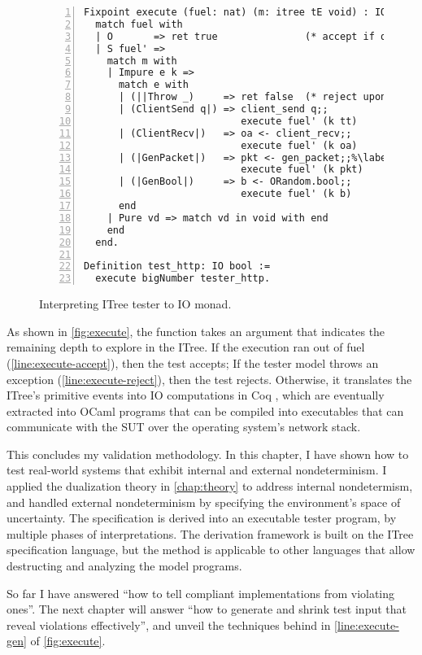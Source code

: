 \begin{figure}
\begin{lstlisting}[style=customcoq,numbers=left,escapechar=\%]
Fixpoint execute (fuel: nat) (m: itree tE void) : IO bool :=
  match fuel with
  | O       => ret true               (* accept if out of fuel *)%\label{line:execute-accept}%
  | S fuel' =>
    match m with
    | Impure e k =>
      match e with
      | (||Throw _)     => ret false  (* reject upon exception *)%\label{line:execute-reject}%
      | (ClientSend q|) => client_send q;;
                           execute fuel' (k tt)
      | (ClientRecv|)   => oa <- client_recv;;
                           execute fuel' (k oa)
      | (|GenPacket|)   => pkt <- gen_packet;;%\label{line:execute-gen}%
                           execute fuel' (k pkt)
      | (|GenBool|)     => b <- ORandom.bool;;
                           execute fuel' (k b)
      end
    | Pure vd => match vd in void with end
    end
  end.

Definition test_http: IO bool :=
  execute bigNumber tester_http.
\end{lstlisting}
\caption{Interpreting ITree tester to IO monad.}
\label{fig:execute}
\end{figure}

As shown in \autoref{fig:execute}, the  function takes an
argument  that indicates the remaining depth to explore in the ITree.
If the execution ran out of fuel (\autoref{line:execute-accept}), then the test
accepts; If the tester model throws an exception
(\autoref{line:execute-reject}), then the test rejects.  Otherwise, it
translates the ITree's primitive events into IO computations in Coq , which are eventually extracted into OCaml programs
that can be compiled into executables that can communicate with the SUT over the
operating system's network stack.

This concludes my validation methodology.  In this chapter, I have shown how to
test real-world systems that exhibit internal and external nondeterminism.  I
applied the dualization theory in \autoref{chap:theory} to address internal
nondetermism, and handled external nondeterminism by specifying the
environment's space of uncertainty.  The specification is derived into an
executable tester program, by multiple phases of interpretations.  The
derivation framework is built on the ITree specification language, but the
method is applicable to other languages that allow destructing and analyzing the
model programs.

So far I have answered ``how to tell compliant implementations from violating
ones''.  The next chapter will answer ``how to generate and shrink test input
that reveal violations effectively'', and unveil the techniques behind
 in \autoref{line:execute-gen} of \autoref{fig:execute}.
